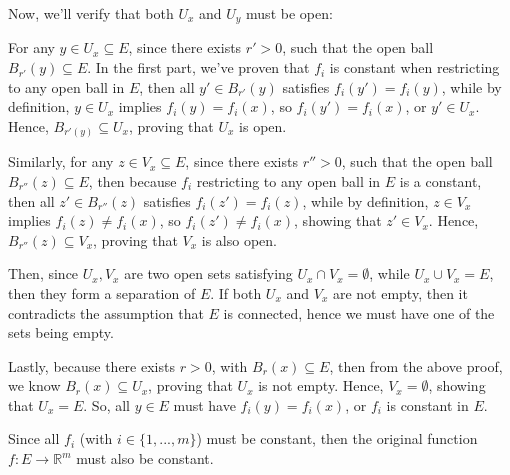 \documentclass{article}
\begin{document}
Now, we'll verify that both $U_x$ and $U_y$ must be open: 

For any $y\in U_x\subseteq E$, since there exists $r'>0$, such that the open ball $B_{r'}(y)\subseteq E$. In the first part, we've proven that $f_i$ is constant when restricting to any open ball in $E$,
then all $y'\in B_{r'}(y)$ satisfies $f_i(y')=f_i(y)$, while by definition, $y\in U_x$ implies $f_i(y)=f_i(x)$, so $f_i(y')=f_i(x)$, or $y'\in U_x$.
Hence, $B_{r'(y)}\subseteq U_x$, proving that $U_x$ is open.

Similarly, for any $z\in V_x\subseteq E$, since there exists $r''>0$, such that the open ball $B_{r''}(z)\subseteq E$, then because $f_i$ restricting to any open ball in $E$ is a constant,
then all $z'\in B_{r''}(z)$ satisfies $f_i(z')=f_i(z)$, while by definition, $z\in V_x$ implies $f_i(z)\neq f_i(x)$, so $f_i(z')\neq f_i(x)$, showing that $z'\in V_x$.
Hence, $B_{r''}(z)\subseteq V_x$, proving that $V_x$ is also open.

Then, since $U_x,V_x$ are two open sets satisfying $U_x\cap V_x = \emptyset$, while $U_x\cup V_x=E$, then they form a separation of $E$. If both $U_x$ and $V_x$ are not empty, then it contradicts the assumption that $E$ is connected,
hence we must have one of the sets being empty.

Lastly, because there exists $r>0$, with $B_r(x)\subseteq E$, then from the above proof, we know $B_r(x)\subseteq U_x$, proving that $U_x$ is not empty. Hence, $V_x=\emptyset$, showing that $U_x=E$.
So, all $y\in E$ must have $f_i(y)=f_i(x)$, or $f_i$ is constant in $E$.

\hfil

Since all $f_i$ (with $i\in \{1,...,m\}$) must be constant, then the original function $f:E\rightarrow\mathbb{R}^m$ must also be constant.

\hfil

\hfil
\end{document}
